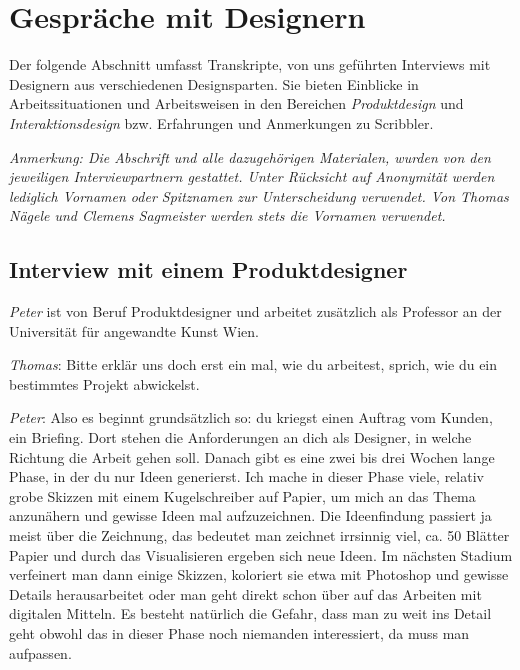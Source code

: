 
\chapter{Gespr{\"a}che mit Designern}\label{ch:interviews}
Der folgende Abschnitt umfasst Transkripte, von uns geführten Interviews mit Designern aus verschiedenen Designsparten. Sie bieten Einblicke in Arbeitssituationen und Arbeitsweisen in den Bereichen \emph{Produktdesign} und \emph{Interaktionsdesign} bzw. Erfahrungen und Anmerkungen zu Scribbler.

\medskip \emph{Anmerkung: Die Abschrift und alle dazugehörigen Materialen, wurden von den jeweiligen Interviewpartnern gestattet. Unter Rücksicht auf Anonymität werden lediglich Vornamen oder Spitznamen zur Unterscheidung verwendet. Von Thomas Nägele und Clemens Sagmeister werden stets die Vornamen verwendet.}

\section{Interview mit einem Produktdesigner}
\emph{Peter} ist von Beruf Produktdesigner und arbeitet zusätzlich als Professor an der Universität für angewandte Kunst Wien. 

\medskip \emph{Thomas}: Bitte erklär uns doch erst ein mal, wie du arbeitest, sprich, wie du ein bestimmtes Projekt abwickelst.

\medskip \emph{Peter}: Also es beginnt grundsätzlich so: du kriegst einen Auftrag vom Kunden, ein Briefing. Dort stehen die Anforderungen an dich als Designer, in welche Richtung die Arbeit gehen soll. Danach gibt es eine zwei bis drei Wochen lange Phase, in der du nur Ideen generierst. Ich mache in dieser Phase viele, relativ grobe Skizzen mit einem Kugelschreiber auf Papier, um mich an das Thema anzunähern und gewisse Ideen mal aufzuzeichnen. Die Ideenfindung passiert ja meist über die Zeichnung, das bedeutet man zeichnet irrsinnig viel, ca. 50 Blätter Papier und durch das Visualisieren ergeben sich neue Ideen. Im nächsten Stadium verfeinert man dann einige Skizzen, koloriert sie etwa mit Photoshop und gewisse Details herausarbeitet oder man geht direkt schon über auf das Arbeiten mit digitalen Mitteln. Es besteht natürlich die Gefahr, dass man zu weit ins Detail geht obwohl das in dieser Phase noch niemanden interessiert, da muss man aufpassen. 

